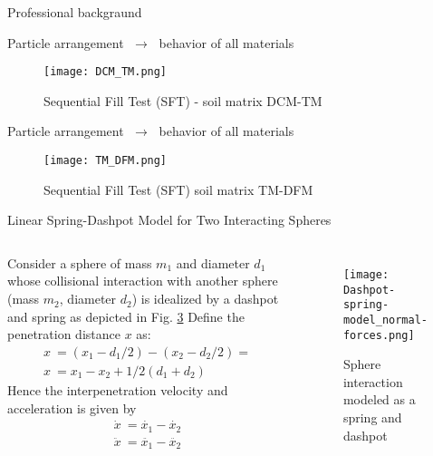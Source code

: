 \documentclass[10pt,xcolor=dvipsnames]{beamer}
\begin{document}
{\begin{frame}{Professional backgraund}
{
\usenavigationsymbolstemplate{}

%
%
\begin{frame}[fragile]{Particle arrangement $\;\longrightarrow\;$  behavior of all materials}
\begin{figure}[H]

   \centering
     \texttt{[image: DCM\_TM.png]}
        \caption{Sequential Fill Test (SFT) - soil matrix DCM-TM}
        \label{fig:EXP-SFT2}
\end{figure}

\end{frame}
}
{
\usenavigationsymbolstemplate{}

%
%
\begin{frame}[fragile]{Particle arrangement $\;\longrightarrow\;$  behavior of all materials}
\begin{figure}[H]

   \centering
     \texttt{[image: TM\_DFM.png]}
        \caption{Sequential Fill Test (SFT) soil matrix TM-DFM}
        \label{fig:EXP-SFT3}
\end{figure}

\end{frame}

\begin{frame} {Linear Spring-Dashpot Model for Two Interacting Spheres}
\begin{columns}[T,onlytextwidth]
\vspace{0.32cm}
Consider a sphere of mass $m_{1}$ and diameter $d_{1}$ whose collisional interaction with another sphere (mass $m_{2}$, diameter $d_{2}$) is idealized by a dashpot and spring as depicted in Fig. \ref{fig:dp} Define the penetration distance $x$ as:
\begin{align}
x\:=(x_{1}-d_{1}/2)-(x_{2}-d_{2}/2)=\\
x\:=x_{1}-x_{2}+1/2(d_{1}+d_{2})
\end{align}
Hence the interpenetration velocity and acceleration is given by
\begin{align}
\dot{x}\:=\dot{x_{1}}-\dot{x_{2}}\\
\ddot{x}\:=\ddot{x_{1}}-\ddot{x_{2}}
\end{align}


\begin{figure}[t]
\centering
\texttt{[image: Dashpot-spring-model\_normal-forces.png]}
\caption{Sphere interaction modeled as a spring and dashpot \cite{goniva2010open}}
\label{fig:dp}
\end{figure}


\end{columns}
\end{frame}}
\end{frame}}
\end{document}
